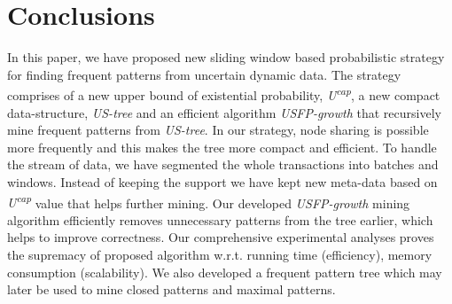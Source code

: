 \documentclass[conference]{IEEEtran}
\begin{document}
\section{Conclusions}\label{Conclusion}
In this paper, we have proposed new sliding window based probabilistic strategy for finding frequent patterns from uncertain dynamic data. The strategy comprises of a new upper bound of existential probability, \emph{U\textsuperscript{cap}}, a new compact data-structure, \emph{US-tree} and an efficient algorithm \emph{USFP-growth} that recursively mine frequent patterns from \emph{US-tree}. In our strategy, node sharing is possible more frequently and this makes the tree more compact and efficient. To handle the stream of data, we have segmented the whole transactions into batches and windows. Instead of keeping the support we have kept new meta-data based on \emph{U\textsuperscript{cap}} value that helps further mining. Our developed \emph{USFP-growth} mining algorithm efficiently removes unnecessary patterns from the tree earlier, which helps to improve correctness. Our comprehensive experimental analyses proves the supremacy of proposed algorithm w.r.t. running time (efficiency), memory consumption (scalability). We also developed a frequent pattern tree which may later be used to mine closed patterns and maximal patterns.

%

\end{document}

